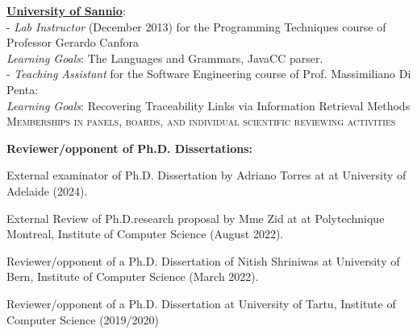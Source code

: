 \documentclass[11pt]{article}
\begin{document}
\href{http://www.unisa.it}{\textbf{University of Sannio}}:
\medskip\\
- \textit{Lab Instructor} (December 2013) for the Programming Techniques course of Professor Gerardo Canfora\\   \textit{Learning Goals}:   The Languages ​​and Grammars, JavaCC parser.\\
- \textit{Teaching Assistant } for the Software Engineering course of Prof. Massimiliano Di Penta:\\   \textit{Learning Goals}:   
Recovering Traceability Links via Information Retrieval Methods
\medskip\medskip \\
\textsc{Memberships in panels, boards, and individual scientific reviewing activities}

\medskip 

\textbf{Reviewer/opponent of Ph.D. Dissertations:}
\begin{innerlist}
   \item External examinator of Ph.D. Dissertation   by Adriano Torres at at University of Adelaide (2024).
   \item External Review of Ph.D.research proposal  by Mme Zid at at Polytechnique Montreal, Institute of Computer Science (August 2022).
   \item Reviewer/opponent of a Ph.D. Dissertation   of Nitish Shriniwas at University of Bern, Institute of Computer Science (March 2022).
   \item Reviewer/opponent of a Ph.D. Dissertation  at University of Tartu, Institute of Computer Science (2019/2020)
\end{innerlist}
\medskip 
\end{document}
